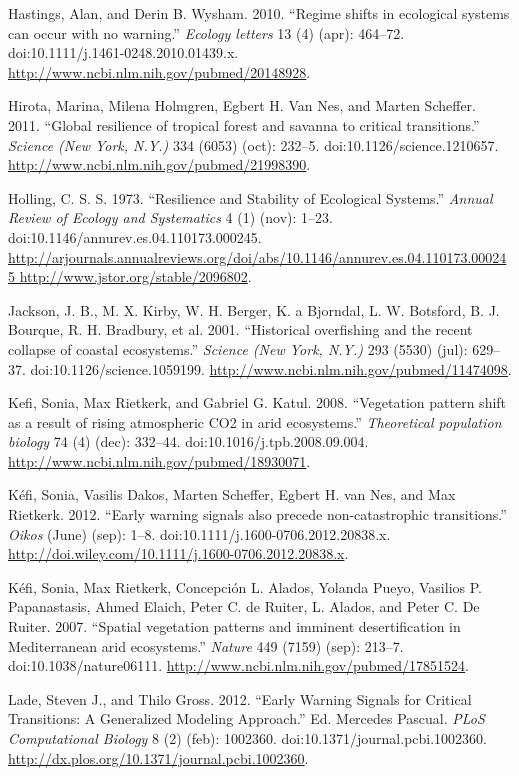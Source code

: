 \documentclass[author-year, review]{elsarticle} %
\begin{document}
Hastings, Alan, and Derin B. Wysham. 2010. ``Regime shifts in ecological
systems can occur with no warning.'' \emph{Ecology letters} 13 (4)
(apr): 464--72. doi:10.1111/j.1461-0248.2010.01439.x.
\url{http://www.ncbi.nlm.nih.gov/pubmed/20148928}.

Hirota, Marina, Milena Holmgren, Egbert H. Van Nes, and Marten Scheffer.
2011. ``Global resilience of tropical forest and savanna to critical
transitions.'' \emph{Science (New York, N.Y.)} 334 (6053) (oct): 232--5.
doi:10.1126/science.1210657.
\url{http://www.ncbi.nlm.nih.gov/pubmed/21998390}.

Holling, C. S. S. 1973. ``Resilience and Stability of Ecological
Systems.'' \emph{Annual Review of Ecology and Systematics} 4 (1) (nov):
1--23. doi:10.1146/annurev.es.04.110173.000245.
\href{http://arjournals.annualreviews.org/doi/abs/10.1146/annurev.es.04.110173.000245 http://www.jstor.org/stable/2096802}{http://arjournals.annualreviews.org/doi/abs/10.1146/annurev.es.04.110173.000245
http://www.jstor.org/stable/2096802}.

Jackson, J. B., M. X. Kirby, W. H. Berger, K. a Bjorndal, L. W.
Botsford, B. J. Bourque, R. H. Bradbury, et al. 2001. ``Historical
overfishing and the recent collapse of coastal ecosystems.''
\emph{Science (New York, N.Y.)} 293 (5530) (jul): 629--37.
doi:10.1126/science.1059199.
\url{http://www.ncbi.nlm.nih.gov/pubmed/11474098}.

Kefi, Sonia, Max Rietkerk, and Gabriel G. Katul. 2008. ``Vegetation
pattern shift as a result of rising atmospheric CO2 in arid
ecosystems.'' \emph{Theoretical population biology} 74 (4) (dec):
332--44. doi:10.1016/j.tpb.2008.09.004.
\url{http://www.ncbi.nlm.nih.gov/pubmed/18930071}.

Kéfi, Sonia, Vasilis Dakos, Marten Scheffer, Egbert H. van Nes, and Max
Rietkerk. 2012. ``Early warning signals also precede non-catastrophic
transitions.'' \emph{Oikos} (June) (sep): 1--8.
doi:10.1111/j.1600-0706.2012.20838.x.
\url{http://doi.wiley.com/10.1111/j.1600-0706.2012.20838.x}.

Kéfi, Sonia, Max Rietkerk, Concepción L. Alados, Yolanda Pueyo, Vasilios
P. Papanastasis, Ahmed Elaich, Peter C. de Ruiter, L. Alados, and Peter
C. De Ruiter. 2007. ``Spatial vegetation patterns and imminent
desertification in Mediterranean arid ecosystems.'' \emph{Nature} 449
(7159) (sep): 213--7. doi:10.1038/nature06111.
\url{http://www.ncbi.nlm.nih.gov/pubmed/17851524}.

Lade, Steven J., and Thilo Gross. 2012. ``Early Warning Signals for
Critical Transitions: A Generalized Modeling Approach.'' Ed. Mercedes
Pascual. \emph{PLoS Computational Biology} 8 (2) (feb): 1002360.
doi:10.1371/journal.pcbi.1002360.
\url{http://dx.plos.org/10.1371/journal.pcbi.1002360}.
\end{document}
